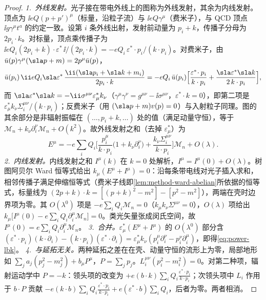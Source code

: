 \begin{proof}
\emph{1.~外线发射。}光子接在带电外线上的图称为外线发射，其余为内线发射。顶点为 $\ii eQ(p+p')^\mu$（标量，沿粒子流）与 $\ii eQ\gamma^\mu$（费米子），与 QCD 顶点 $\ii g\gamma^\mu t^a$ 的约定一致。设第 $i$ 条外线出射，发射前动量为 $p_i+k$，传播子分母为 $2p_i\cdot k$。对标量，顶点乘传播子为 $\ii eQ_i(2p_i+k)\cdot\varepsilon^*\,\ii/(2p_i\cdot k)=-eQ_i\,\varepsilon^*\!\cdot p_i/(k\cdot p_i)$。对费米子，由 $\bar u(p)\gamma^\mu(\sla p+m)=2p^\mu\bar u(p)$，
\begin{equation*}
\bar u(p_i)\,\ii eQ_i\sla\varepsilon^*\,\frac{\ii(\sla p_i+\sla k+m_i)}{2p_i\cdot k}=-eQ_i\,\bar u(p_i)\Big[\frac{\varepsilon^*\!\cdot p_i}{k\cdot p_i}+\frac{\sla\varepsilon^*\sla k}{2\,k\cdot p_i}\Big],
\end{equation*}
而 $\sla\varepsilon^*\sla k=-\ii\sigma^{\mu\nu}\varepsilon^*_\mu k_\nu$（$\gamma^\mu\gamma^\nu=g^{\mu\nu}-\ii\sigma^{\mu\nu}$，$\varepsilon^*\!\cdot k=0$），即第二项是 $\varepsilon^*_\mu k_\nu\Sigma_i^{\mu\nu}/(k\cdot p_i)$；反费米子（用 $(\sla p+m)v(p)=0$）与入射粒子同理。图的其余部分是非辐射振幅在 $(\dots,p_i+k,\dots)$ 处的值（满足动量守恒），等于 $\mathcal M_n+k_\nu\partial_i^\nu\mathcal M_n+O(k^2)$。故外线发射之和（去掉 $\varepsilon^*_\mu$）为
\begin{equation}\label{eq:power-lbk-ext}
E^\mu=-e\sum_iQ_i\Big[\frac{p_i^\mu}{k\cdot p_i}\big(1+k_\nu\partial_i^\nu\big)+\frac{k_\nu\Sigma_i^{\mu\nu}}{k\cdot p_i}\Big]\mathcal M_n+O(\lambda).
\end{equation}
\emph{2.~内线发射。}内线发射之和 $I^\mu(k)$ 在 $k=0$ 处解析，$I^\mu=I^\mu(0)+O(\lambda)$。树图阿贝尔 Ward 恒等式给出 $k_\mu(E^\mu+I^\mu)=0$：沿每条带电线对光子插入求和，相邻传播子满足伸缩恒等式（费米子线即\cref{lem:method-ward-abelian}所依据的恒等式，标量线为 $(2p+k)\cdot k=[(p+k)^2-m^2]-[p^2-m^2]$），两端在壳时边界项为零。其 $O(\lambda^0)$ 项是 $-e\sum_iQ_i\mathcal M_n=0$（$k_\mu k_\nu\Sigma^{\mu\nu}=0$），$O(\lambda)$ 项给出 $k_\mu\big[I^\mu(0)-e\sum_iQ_i\partial_i^\mu\mathcal M_n\big]=0$。类光矢量张成闵氏空间，故 $I^\mu(0)=e\sum_iQ_i\partial_i^\mu\mathcal M_n$。
\emph{3.~合并。}$\varepsilon^*_\mu(E^\mu+I^\mu)$ 的 $O(\lambda^0)$ 部分含 $(\varepsilon^*\!\cdot p_i)(k\cdot\partial_i)-(k\cdot p_i)(\varepsilon^*\!\cdot\partial_i)=\varepsilon^*_\mu k_\nu(p_i^\mu\partial_i^\nu-p_i^\nu\partial_i^\mu)$，即得\eqref{eq:power-lbk}。
\emph{4.~与延拓无关。}两种延拓之差在在壳、动量守恒的流形上为零，局部地形如 $\sum_ja_j(p_j^2-m_j^2)+b_\mu P^\mu$，$P=\sum_jp_j$。$L_i^{\mu\nu}(p_i^2-m_i^2)=0$。对第二种项，辐射运动学中 $P=-k$：领头项的改变为 $+e(b\cdot k)\sum_iQ_i\frac{\varepsilon^*\cdot p_i}{k\cdot p_i}$；次领头项中 $L_i$ 作用于 $b\cdot P$ 贡献 $-e(k\cdot b)\sum_iQ_i\frac{\varepsilon^*\cdot p_i}{k\cdot p_i}+e(\varepsilon^*\!\cdot b)\sum_iQ_i$，后者为零。两者相消。

\end{proof}
